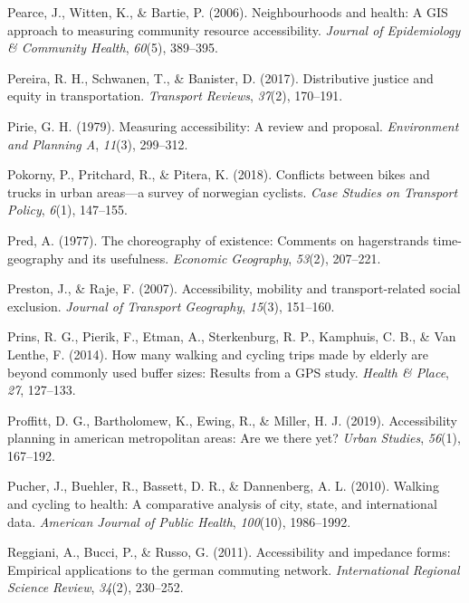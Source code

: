\documentclass[
11pt, %
oneside, %
english, %
singlespacing, %
]{macthesis} %
\newlength{\cslhangindent}
\newenvironment{CSLReferences}[2] %
{\begin{list}{}{%
	\setlength{\itemindent}{0pt}
	\setlength{\leftmargin}{0pt}
	\setlength{\parsep}{0pt}
	\ifodd #1
	\setlength{\leftmargin}{\cslhangindent}
	\setlength{\itemindent}{-1\cslhangindent}
	\fi
	\setlength{\itemsep}{#2\baselineskip}}}
{\end{list}}
\begin{document}
\begin{CSLReferences}{1}{0}
Pearce, J., Witten, K., \& Bartie, P. (2006). Neighbourhoods and health: A GIS approach to measuring community resource accessibility. \emph{Journal of Epidemiology \& Community Health}, \emph{60}(5), 389--395.

Pereira, R. H., Schwanen, T., \& Banister, D. (2017). Distributive justice and equity in transportation. \emph{Transport Reviews}, \emph{37}(2), 170--191.

Pirie, G. H. (1979). Measuring accessibility: A review and proposal. \emph{Environment and Planning A}, \emph{11}(3), 299--312.

Pokorny, P., Pritchard, R., \& Pitera, K. (2018). Conflicts between bikes and trucks in urban areas---a survey of norwegian cyclists. \emph{Case Studies on Transport Policy}, \emph{6}(1), 147--155.

Pred, A. (1977). The choreography of existence: Comments on hagerstrands time-geography and its usefulness. \emph{Economic Geography}, \emph{53}(2), 207--221.

Preston, J., \& Raje, F. (2007). Accessibility, mobility and transport-related social exclusion. \emph{Journal of Transport Geography}, \emph{15}(3), 151--160.

Prins, R. G., Pierik, F., Etman, A., Sterkenburg, R. P., Kamphuis, C. B., \& Van Lenthe, F. (2014). How many walking and cycling trips made by elderly are beyond commonly used buffer sizes: Results from a GPS study. \emph{Health \& Place}, \emph{27}, 127--133.

Proffitt, D. G., Bartholomew, K., Ewing, R., \& Miller, H. J. (2019). Accessibility planning in american metropolitan areas: Are we there yet? \emph{Urban Studies}, \emph{56}(1), 167--192.

Pucher, J., Buehler, R., Bassett, D. R., \& Dannenberg, A. L. (2010). Walking and cycling to health: A comparative analysis of city, state, and international data. \emph{American Journal of Public Health}, \emph{100}(10), 1986--1992.

Reggiani, A., Bucci, P., \& Russo, G. (2011). Accessibility and impedance forms: Empirical applications to the german commuting network. \emph{International Regional Science Review}, \emph{34}(2), 230--252.


\end{CSLReferences}
\end{document}
